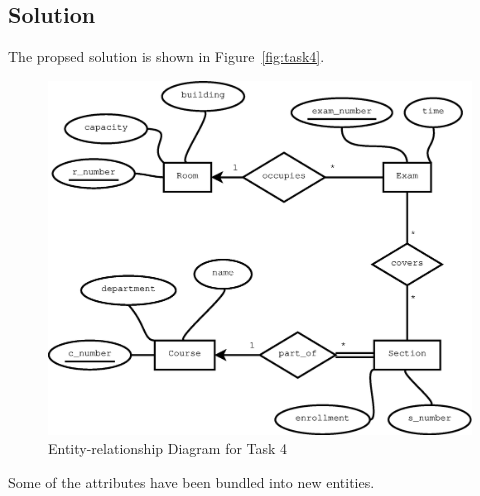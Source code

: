 \subsection{Solution}
The propsed solution is shown in Figure~\ref{fig:task4}.

\begin{figure}[htbp]
  \centering
  \includegraphics[width=\linewidth]{include/task4.eps}
    \caption{Entity-relationship Diagram for Task 4}
  \label{fig:task3}
\end{figure}

Some of the attributes have been bundled into new entities.
